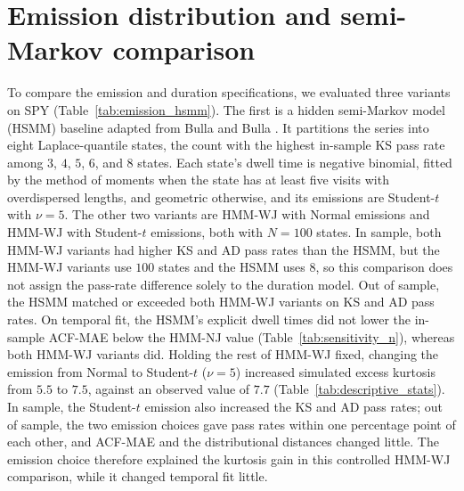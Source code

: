 \section{Emission distribution and semi-Markov comparison}
\label{sec:supp-emission-hsmm}

To compare the emission and duration specifications, we evaluated
three variants on SPY (Table~\ref{tab:emission_hsmm}). The first is a
hidden semi-Markov model (HSMM) baseline adapted from Bulla and Bulla
\cite{bullaBulla2006}. It partitions the series into eight
Laplace-quantile states, the count with the highest in-sample KS pass
rate among $3$, $4$, $5$, $6$, and $8$ states. Each state's dwell
time is negative binomial, fitted by the method of moments when the
state has at least five visits with overdispersed lengths, and
geometric otherwise, and its emissions are Student-$t$ with $\nu = 5$.
The other two variants are HMM-WJ with Normal emissions and HMM-WJ
with Student-$t$ emissions, both with $N = 100$ states. In sample,
both HMM-WJ variants had higher KS and AD pass rates than the HSMM,
but the HMM-WJ variants use $100$ states and the HSMM uses $8$, so
this comparison does not assign the pass-rate difference solely to
the duration model. Out of sample, the HSMM matched or exceeded both
HMM-WJ variants on KS and AD pass rates. On temporal fit, the HSMM's
explicit dwell times did not lower the in-sample ACF-MAE below the
HMM-NJ value (Table~\ref{tab:sensitivity_n}), whereas both HMM-WJ
variants did. Holding the rest of HMM-WJ fixed, changing the emission
from Normal to Student-$t$ ($\nu=5$) increased simulated excess
kurtosis from $5.5$ to $7.5$, against an observed value of $7.7$
(Table~\ref{tab:descriptive_stats}). In sample, the Student-$t$
emission also increased the KS and AD pass rates; out of sample, the
two emission choices gave pass rates within one percentage point of
each other, and ACF-MAE and the distributional distances changed
little. The emission choice therefore explained the kurtosis gain in
this controlled HMM-WJ comparison, while it changed temporal fit
little.

